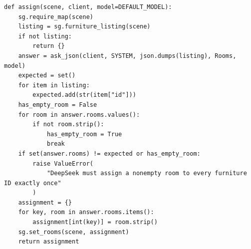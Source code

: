\documentclass[11pt,a4paper]{book}
\begin{document}
\begin{lstlisting}[firstnumber=18]
def assign(scene, client, model=DEFAULT_MODEL):
    sg.require_map(scene)
    listing = sg.furniture_listing(scene)
    if not listing:
        return {}
    answer = ask_json(client, SYSTEM, json.dumps(listing), Rooms, model)
    expected = set()
    for item in listing:
        expected.add(str(item["id"]))
    has_empty_room = False
    for room in answer.rooms.values():
        if not room.strip():
            has_empty_room = True
            break
    if set(answer.rooms) != expected or has_empty_room:
        raise ValueError(
            "DeepSeek must assign a nonempty room to every furniture ID exactly once"
        )
    assignment = {}
    for key, room in answer.rooms.items():
        assignment[int(key)] = room.strip()
    sg.set_rooms(scene, assignment)
    return assignment
\end{lstlisting}
\end{document}
